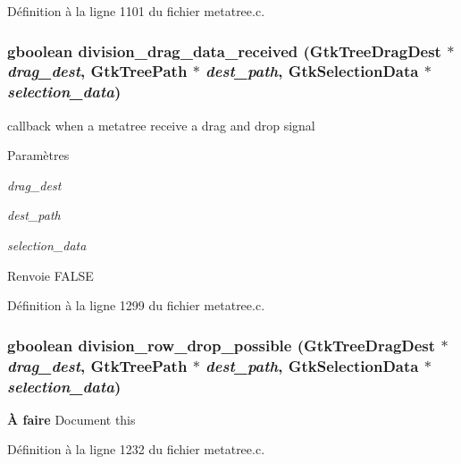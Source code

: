 Définition à la ligne 1101 du fichier metatree.c.

\subsubsection[{division\_\-drag\_\-data\_\-received}]{\setlength{\rightskip}{0pt plus 5cm}gboolean division\_\-drag\_\-data\_\-received (GtkTreeDragDest $\ast$ {\em drag\_\-dest}, \/  GtkTreePath $\ast$ {\em dest\_\-path}, \/  GtkSelectionData $\ast$ {\em selection\_\-data})}\label{metatree_8h_a77e243b108bde662e9dced05ccef86b8}
callback when a metatree receive a drag and drop signal


\begin{DoxyParams}{Paramètres}
\item[{\em drag\_\-dest}]\item[{\em dest\_\-path}]\item[{\em selection\_\-data}]\end{DoxyParams}
\begin{DoxyReturn}{Renvoie}
FALSE 
\end{DoxyReturn}


Définition à la ligne 1299 du fichier metatree.c.

\subsubsection[{division\_\-row\_\-drop\_\-possible}]{\setlength{\rightskip}{0pt plus 5cm}gboolean division\_\-row\_\-drop\_\-possible (GtkTreeDragDest $\ast$ {\em drag\_\-dest}, \/  GtkTreePath $\ast$ {\em dest\_\-path}, \/  GtkSelectionData $\ast$ {\em selection\_\-data})}\label{metatree_8h_a6be29e102e03a967453310f0224dd450}
\begin{Desc}
\item[{\bf À faire}]Document this\end{Desc}


Définition à la ligne 1232 du fichier metatree.c.

